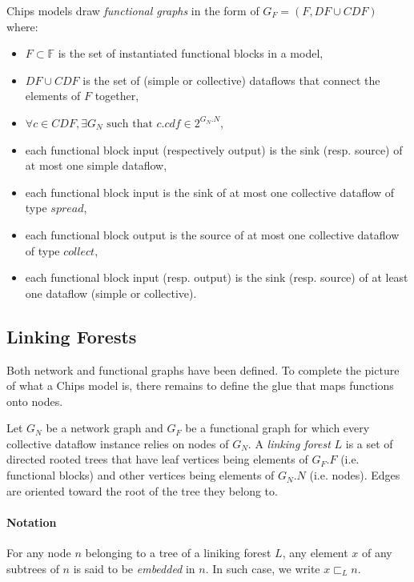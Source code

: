 \documentclass[runningheads]{llncs}
\newcommand{\F}{\mathbb{F}}
\begin{document}
\begin{definition}\label{def:FunctionalGraph}
    Chips models draw \emph{functional graphs} in the form of $G_F = (F, DF\cup CDF)$ where:
    \begin{itemize}
        \item $F \subset \F$ is the set of instantiated functional blocks in a model,
        \item $DF\cup CDF$ is the set of (simple or collective) dataflows that connect the elements of $F$ together,
        \item $\forall c \in CDF, \exists G_N \text{ such that } c.cdf \in 2^{G_N.N}$,
        \item each functional block input (respectively output) is the sink (resp. source) of at most one simple dataflow,
        \item each functional block input is the sink of at most one collective dataflow of type $spread$,
        \item each functional block output is the source of at most one collective dataflow of type $collect$,
        \item each functional block input (resp. output) is the sink (resp. source) of at least one dataflow (simple or collective).
    \end{itemize}
\end{definition}

\subsection{Linking Forests}
\label{sec:linkingforests}

Both network and functional graphs have been defined. To complete the picture of what a Chips model is, there remains to define the glue that maps functions onto nodes.

\begin{definition}\label{def:LinkingForest}
    Let $G_N$ be a network graph and $G_F$ be a functional graph for which every collective dataflow instance relies on nodes of $G_N$.
    A \emph{linking forest} $L$ is a set of directed rooted trees that have leaf vertices being elements of $G_F.F$ (i.e. functional blocks) and other vertices being elements of $G_N.N$ (i.e. nodes). Edges are oriented toward the root of the tree they belong to.
\end{definition}

\paragraph{Notation} For any node $n$ belonging to a tree of a liniking forest $L$, any element $x$ of any subtrees of $n$ is said to be \emph{embedded} in $n$. In such case, we write $x \sqsubset_L n$.
\end{document}
